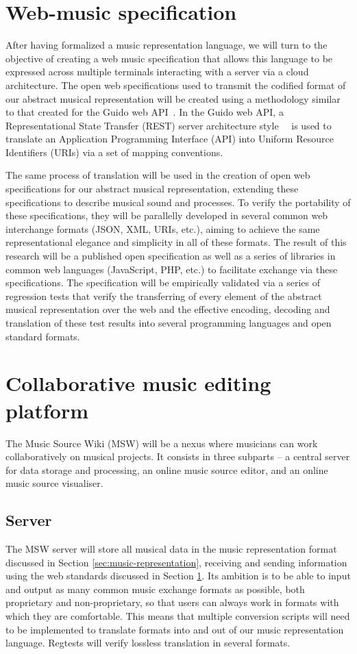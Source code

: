 \documentclass{article}
\begin{document}
\section{Web-music specification}\label{sec:web-music-specification}
After having formalized a music representation language, we will turn to the
objective of creating a web music specification that allows this language to be
expressed across multiple terminals interacting with a server via a cloud
architecture. The open web specifications used to transmit the codified format
of our abstract musical representation will be created using a methodology
similar to that created for the Guido web API~\cite{solomon:2014}.
In the Guido web API, a Representational State Transfer (REST) server architecture
style~\cite{Fielding00}~\cite{richardson2008restful} is used to translate an Application
Programming Interface (API) into Uniform Resource Identifiers (URIs) via a
set of mapping conventions.

The same process of translation will be used in the
creation of open web specifications for our abstract musical representation,
extending these specifications to describe musical sound and processes. To verify
the portability of these specifications, they will be parallelly
developed in several common web interchange formats (JSON, XML, URIs, etc.),
aiming to achieve the same representational elegance and simplicity in all
of these formats. The result of this research will be a published open
specification as well as a series of libraries in common web languages
(JavaScript, PHP, etc.) to facilitate exchange via these specifications. The
specification will be empirically validated via a series of regression tests that
verify the transferring of every element of the abstract musical
representation over the web and the effective encoding, decoding and
translation of these test results into several programming languages and
open standard formats.


\section{Collaborative music editing platform}\label{sec:collaborative-music-editing-platform}
The Music Source Wiki (MSW) will be a nexus where
musicians can work collaboratively on musical projects. It consists in three
subparts -- a central server for data storage and processing, an online
music source editor, and an online music source visualiser.
\subsection{Server}
The MSW server will store all musical data in the music representation format
discussed in Section \ref{sec:music-representation}, receiving and sending
information using the web standards discussed in Section
\ref{sec:web-music-specification}.  Its ambition is to be able to input and
output as many common music exchange formats as possible, both proprietary and
non-proprietary, so that users can always work in formats with which they are
comfortable.  This means that multiple conversion scripts will need to be
implemented to translate formats into and out of our music representation
language.  Regtests will verify lossless translation in several
formats.
\end{document}
